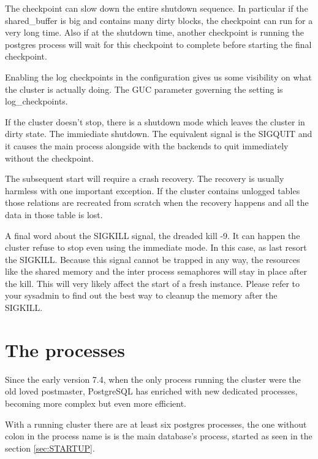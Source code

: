 The checkpoint can slow down the entire shutdown sequence. In particular if the shared\_buffer is
big and contains many dirty blocks, the checkpoint can run for a very long time. Also if at
the shutdown time, another checkpoint is running the postgres process will wait for this
checkpoint to complete before starting the final checkpoint.\newline

Enabling the log checkpoints in the configuration gives us some visibility on what the cluster is
actually doing. The GUC parameter governing the setting is log\_checkpoints.\newline


If the cluster doesn't stop, there is a shutdown mode which leaves the cluster in dirty state.
The immiediate shutdown. The equivalent signal is the SIGQUIT and it causes the main process
alongside with the backends to quit immediately without the checkpoint.\newline

The subsequent start will require a crash recovery. The recovery is usually harmless with one
important exception. If the cluster contains unlogged tables those relations are recreated from
scratch when the recovery happens and all the data in those table is lost.

A final word about the SIGKILL signal, the dreaded kill -9. It can happen the cluster refuse to
stop even using the immediate mode. In this case, as last resort the SIGKILL. Because this signal
cannot be trapped in any way, the resources like the shared memory and the inter process semaphores
will stay in place after the kill. This will very likely affect the start of a fresh instance.
Please refer to your sysadmin to find out the best way to cleanup the memory after the
SIGKILL.

\section{The processes}
\label{sec:PROCESSES}
Since the early version 7.4, when the only process running the cluster were the 
old loved postmaster, PostgreSQL has enriched with new dedicated processes, 
becoming more complex but even more efficient.

With a running cluster there are at least six postgres processes, the one 
without colon in the process name is is the main database's process, started 
as seen in the section \ref{sec:STARTUP}.



